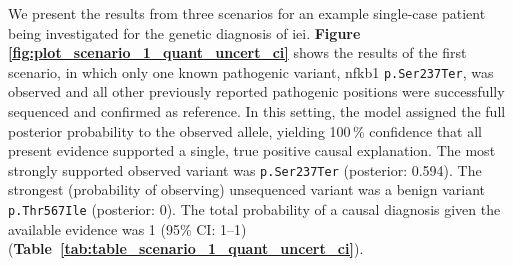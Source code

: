 %
%
%
%
We present the results from three scenarios for an example single-case patient being investigated for the genetic diagnosis of \ac{iei}.
\textbf{Figure \ref{fig:plot_scenario_1_quant_uncert_ci}} shows the results of the first scenario, in which only one known pathogenic variant, \ac{nfkb1} \texttt{p.Ser237Ter}, was observed and all other previously reported pathogenic positions were successfully sequenced and confirmed as reference. 
In this setting, the model assigned the full posterior probability to the observed allele, yielding 100\,\% confidence that all present evidence supported a single, true positive causal explanation. 
The most strongly supported observed variant was \texttt{p.Ser237Ter} (posterior: 0.594). 
The strongest (probability of observing) unsequenced variant was a benign variant \texttt{p.Thr567Ile} (posterior: 0). 
The total probability of a causal diagnosis given the available evidence was 1 (95\% CI: 1--1) (\textbf{Table~\ref{tab:table_scenario_1_quant_uncert_ci}}). 

